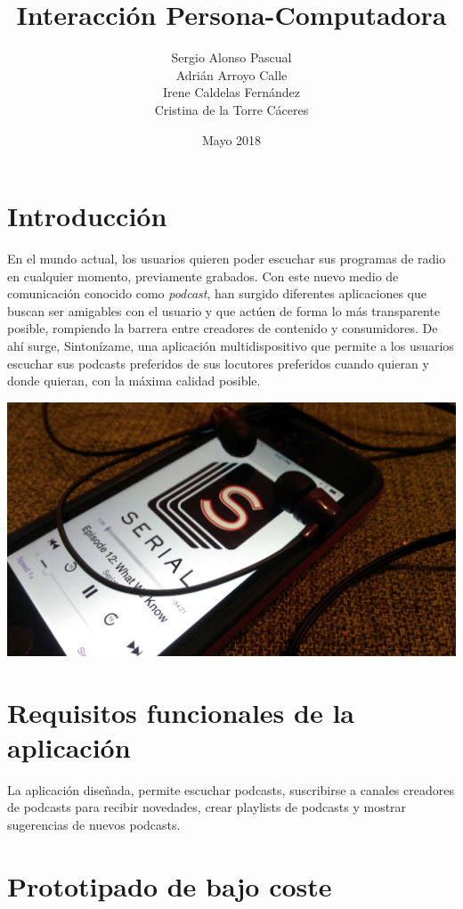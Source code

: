 \documentclass[a4paper]{article}
\title{Interacción Persona-Computadora}
\author{Sergio Alonso Pascual \\ Adrián Arroyo Calle \\ Irene Caldelas Fernández \\ Cristina de la Torre Cáceres}
\date{Mayo 2018}
\begin{document}
\maketitle

\tableofcontents

\pagebreak

\section{Introducción}

En el mundo actual, los usuarios quieren poder escuchar sus programas de radio en cualquier momento, previamente grabados. Con este nuevo medio de comunicación conocido como \textit{podcast}, han surgido diferentes aplicaciones que buscan ser amigables con el usuario y que actúen de forma lo más transparente posible, rompiendo la barrera entre creadores de contenido y consumidores. De ahí surge, Sintonízame, una aplicación multidispositivo que permite a los usuarios escuchar sus podcasts preferidos de sus locutores preferidos cuando quieran y donde quieran, con la máxima calidad posible.

\begin{center}
\includegraphics[width=0.7\columnwidth]{Podcast.jpg}
\end{center}

\section{Requisitos funcionales de la aplicación}

La aplicación diseñada, permite escuchar podcasts, suscribirse a canales creadores de podcasts para recibir novedades, crear playlists de podcasts y mostrar sugerencias de nuevos podcasts.

\section{Prototipado de bajo coste}
\end{document}
